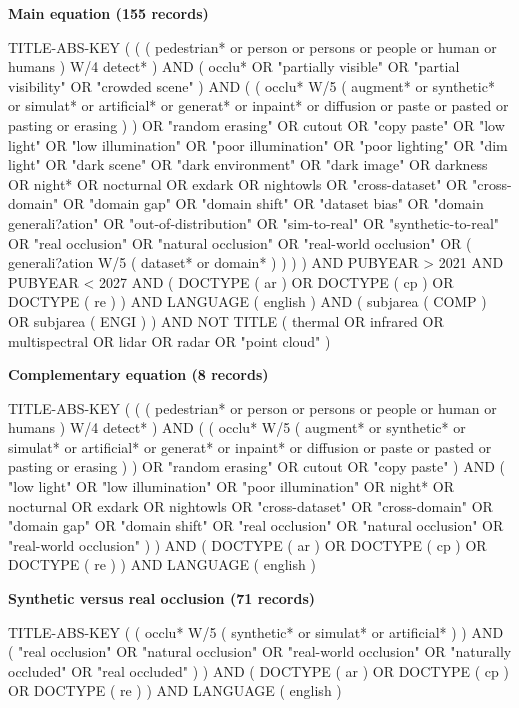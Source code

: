 \documentclass[10pt]{article}
\begin{document}
\noindent\textbf{Main equation (155 records)}\\
{\ttfamily\footnotesize\raggedright TITLE-ABS-KEY ( ( ( pedestrian* or person or persons or people or human or humans ) W/4 detect* ) AND ( occlu* OR "partially visible" OR "partial visibility" OR "crowded scene" ) AND ( ( occlu* W/5 ( augment* or synthetic* or simulat* or artificial* or generat* or inpaint* or diffusion or paste or pasted or pasting or erasing ) ) OR "random erasing" OR cutout OR "copy paste" OR "low light" OR "low illumination" OR "poor illumination" OR "poor lighting" OR "dim light" OR "dark scene" OR "dark environment" OR "dark image" OR darkness OR night* OR nocturnal OR exdark OR nightowls OR "cross-dataset" OR "cross-domain" OR "domain gap" OR "domain shift" OR "dataset bias" OR "domain generali{?}ation" OR "out-of-distribution" OR "sim-to-real" OR "synthetic-to-real" OR "real occlusion" OR "natural occlusion" OR "real-world occlusion" OR ( generali{?}ation W/5 ( dataset* or domain* ) ) ) ) AND PUBYEAR > 2021 AND PUBYEAR < 2027 AND ( DOCTYPE ( ar ) OR DOCTYPE ( cp ) OR DOCTYPE ( re ) ) AND LANGUAGE ( english ) AND ( subjarea ( COMP ) OR subjarea ( ENGI ) ) AND NOT TITLE ( thermal OR infrared OR multispectral OR lidar OR radar OR "point cloud" )\par}

\noindent\textbf{Complementary equation (8 records)}\\
{\ttfamily\footnotesize\raggedright TITLE-ABS-KEY ( ( ( pedestrian* or person or persons or people or human or humans ) W/4 detect* ) AND ( ( occlu* W/5 ( augment* or synthetic* or simulat* or artificial* or generat* or inpaint* or diffusion or paste or pasted or pasting or erasing ) ) OR "random erasing" OR cutout OR "copy paste" ) AND ( "low light" OR "low illumination" OR "poor illumination" OR night* OR nocturnal OR exdark OR nightowls OR "cross-dataset" OR "cross-domain" OR "domain gap" OR "domain shift" OR "real occlusion" OR "natural occlusion" OR "real-world occlusion" ) ) AND ( DOCTYPE ( ar ) OR DOCTYPE ( cp ) OR DOCTYPE ( re ) ) AND LANGUAGE ( english )\par}

\noindent\textbf{Synthetic versus real occlusion (71 records)}\\
{\ttfamily\footnotesize\raggedright TITLE-ABS-KEY ( ( occlu* W/5 ( synthetic* or simulat* or artificial* ) ) AND ( "real occlusion" OR "natural occlusion" OR "real-world occlusion" OR "naturally occluded" OR "real occluded" ) ) AND ( DOCTYPE ( ar ) OR DOCTYPE ( cp ) OR DOCTYPE ( re ) ) AND LANGUAGE ( english )\par}
\end{document}
